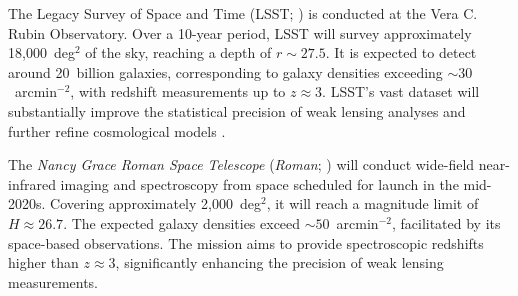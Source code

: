 The Legacy Survey of Space and Time (LSST; \citealt{2009arXiv0912.0201L, 2019ApJ...873..111I}) is conducted at the Vera C. Rubin Observatory. Over a 10-year period, LSST will survey approximately 18,000~deg$^2$ of the sky, reaching a depth of $r \sim 27.5$. It is expected to detect around 20~billion galaxies, corresponding to galaxy densities exceeding $\sim 30$~arcmin$^{-2}$, with redshift measurements up to $z \approx 3$. LSST's vast dataset will substantially improve the statistical precision of weak lensing analyses and further refine cosmological models \citep{2012arXiv1211.0310L}.

The \textit{Nancy Grace Roman Space Telescope} (\emph{Roman}; \citealt{2015arXiv150303757S}) will conduct wide-field near-infrared imaging and spectroscopy from space scheduled for launch in the mid-2020s. Covering approximately 2,000~deg$^2$, it will reach a magnitude limit of $H \approx 26.7$. The expected galaxy densities exceed $\sim 50$~arcmin$^{-2}$, facilitated by its space-based observations. The mission aims to provide spectroscopic redshifts higher than $z \approx 3$, significantly enhancing the precision of weak lensing measurements.